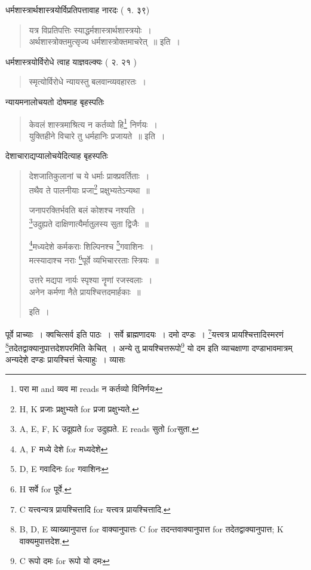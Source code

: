 \documentclass[11pt, openany]{book}
\begin{document}
धर्मशास्त्रार्थशास्त्रयोर्विप्रतिपत्तावाह नारदः ( १. ३९)

\begin{quote}
{\vy यत्र विप्रतिपत्तिः स्याद्धर्मशास्त्रार्थशास्त्रयोः~।\\
अर्थशास्त्रोक्तमुत्सृज्य धर्मशास्त्रोक्तमाचरेत्~॥} इति~।
\end{quote}

धर्मशास्त्रयोर्विरोधे त्वाह याज्ञवल्क्यः ( २. २१ )

\begin{quote}
{\vy स्मृत्योर्विरोधे न्यायस्तु बलवान्व्यवहारतः~।}
\end{quote}

\newpage
{}

न्यायमनालोचयतो दोषमाह बृहस्पतिः 

\begin{quote}
{\vy केवलं शास्त्रमाश्रित्य न कर्तव्यो हि\renewcommand{\thefootnote}{1}\footnote{परा मा and व्यव मा reads न कर्तव्यो विनिर्णयः} निर्णयः~।\\
युक्तिहीने विचारे तु धर्महानिः प्रजायते~॥} इति~।
\end{quote}

देशाचाराद्यप्यालोचयेदित्याह बृहस्पतिः

\begin{quote}
{\vy देशजातिकुलानां च ये धर्माः प्राक्प्रवर्तिताः~।\\
तथैव ते पालनीयाः प्रजा\renewcommand{\thefootnote}{2}\footnote{ H, K प्रजाः प्रक्षुभ्यते for प्रजा प्रक्षुभ्यते.} प्रक्षुभ्यतेऽन्यथा~॥

जनापरक्तिर्भवति बलं कोशश्च नश्यति~।\\
\renewcommand{\thefootnote}{3}\footnote{A, E, F, K उदूह्यते for उदुह्यते. E reads सुतो forसुता.}उदुह्यते दाक्षिणात्यैर्मातुलस्य सुता द्विजैः~॥

\renewcommand{\thefootnote}{4}\footnote{A, F मध्ये देशे for मध्यदेशे}मध्यदेशे कर्मकराः शिल्पिनश्च \renewcommand{\thefootnote}{5}\footnote{D, E गवादिनः for गवाशिनः}गवाशिनः~।\\
मत्स्यादाश्च नराः \renewcommand{\thefootnote}{6}\footnote{H सर्वे for पूर्वे.}पूर्वे व्यभिचाररताः स्त्रियः~॥

उत्तरे मद्यपा नार्यः स्पृश्या नॄणां रजस्वलाः~।\\
अनेन कर्मणा नैते प्रायश्चित्तदमार्हकाः~॥} इति~।
\end{quote}

पूर्वे प्राच्याः~। क्वचित्सर्व इति पाठः~। सर्वे ब्राह्मणादयः~। दमो दण्डः~। \renewcommand{\thefootnote}{7}\footnote{C यत्त्वन्यत्र प्रायश्चित्तादि for यत्त्वत्र प्रायश्चित्तादि.}यत्त्वत्र प्रायश्चित्तादिस्मरणं \renewcommand{\thefootnote}{8}\footnote{B, D, E व्याख्यानुपात्त for वाक्यानुपात्तः C for तदन्तवाक्यानुपात्त for तदेतद्वाक्यानुपात्त; K वाक्यमुपात्तदेश.}तदेतद्वाक्यानुपात्तदेशपरमिति केचित्~। अन्ये तु प्रायश्चित्तरूपो\renewcommand{\thefootnote}{9}\footnote{C रूपो दमः for रूपो यो दमः} यो दम इति व्याचक्षाणा दण्डाभावमात्रम् अन्यदेशे दण्डः प्रायश्चित्तं चेत्याहुः~। व्यासः
\end{document}
